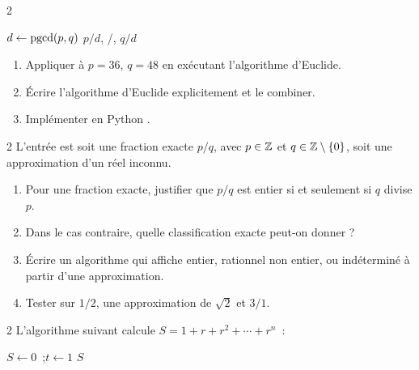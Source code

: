 \begin{bilan}
\begin{exo}{2}

\begin{algorithm}[H]
\caption{Simplification de $p/q$}
$d \leftarrow \operatorname{pgcd}(p,q)$
\Afficher $p/d$, \og/\fg, $q/d$\;
\end{algorithm}

\begin{enumerate}
  \item Appliquer \`a $p=36$, $q=48$ en ex\'ecutant l'algorithme d'Euclide.
  \item \'Ecrire l'algorithme d'Euclide explicitement et le combiner.
  \item Impl\'ementer en Python \computer.
\end{enumerate}
\end{exo}

\begin{exo}{2}
L'entr\'ee est soit une fraction exacte $p/q$, avec $p\in\mathbb{Z}$ et
$q\in\mathbb{Z}\setminus\{0\}$, soit une approximation d'un r\'eel inconnu.
\begin{enumerate}
  \item Pour une fraction exacte, justifier que $p/q$ est entier si et seulement si $q$ divise $p$.
  \item Dans le cas contraire, quelle classification exacte peut-on donner ?
  \item \'Ecrire un algorithme qui affiche \og entier\fg, \og rationnel non entier\fg,
        ou \og ind\'etermin\'e \`a partir d'une approximation\fg.
  \item Tester sur $1/2$, une approximation de $\sqrt2$ et $3/1$.
\end{enumerate}
\end{exo}

\begin{exo}{2}
L'algorithme suivant calcule $S = 1 + r + r^2 + \cdots + r^n$~:

\begin{algorithm}[H]
\caption{Somme g\'eom\'etrique}
$S \leftarrow 0$~;\quad $t \leftarrow 1$\;
\Afficher $S$\;
\end{algorithm}


\end{exo}
\end{bilan}

